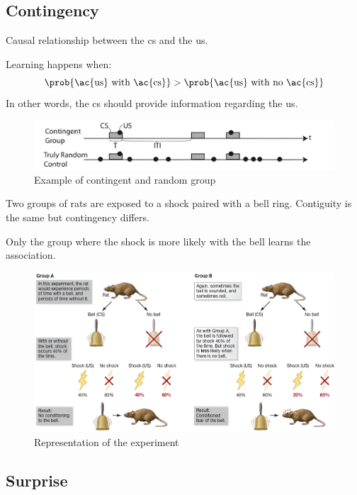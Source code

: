 \subsection{Contingency}

Causal relationship between the \acl{cs} and the \acl{us}.

\begin{remark}
    Learning happens when:
    \[ \prob{\text{\ac{us} with \ac{cs}}} > \prob{\text{\ac{us} with no \ac{cs}}} \]
    In other words, the \ac{cs} should provide information regarding the \ac{us}.
\end{remark}

\begin{figure}[H]
    \centering
    \includegraphics[width=0.6\linewidth]{./img/contingency.png}
    \caption{Example of contingent and random group}
\end{figure}

\begin{casestudy}
    Two groups of rats are exposed to a shock paired with a bell ring.
    Contiguity is the same but contingency differs.

    Only the group where the shock is more likely with the bell learns the association.

    \begin{figure}[H]
        \centering
        \includegraphics[width=0.8\linewidth]{./img/contingency_rats.png}
        \caption{Representation of the experiment}
    \end{figure}
\end{casestudy}


\subsection{Surprise}

